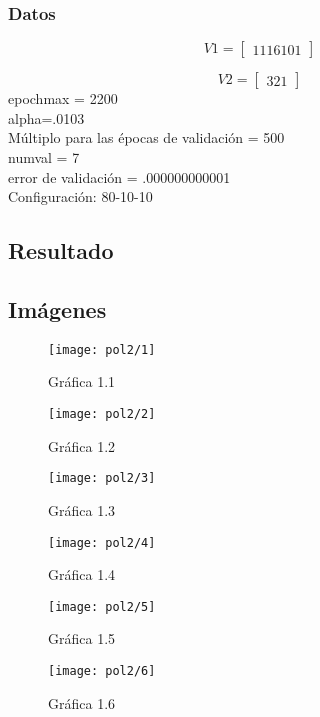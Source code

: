 \documentclass{article}
\begin{document}
\subsubsection{Datos}
\[V1=
\begin{bmatrix}
11 16 10 1
\end{bmatrix}\]

\[V2=
\begin{bmatrix}
3 2 1
\end{bmatrix}\]
epochmax = 2200\\
alpha=.0103\\
Múltiplo para las épocas de validación = 500\\
numval = 7\\
error de validación = .000000000001\\
Configuración: 80-10-10
\subsection{Resultado}
\subsection{Imágenes}
\begin{figure}[htpb]
	\centering
	\texttt{[image: pol2/1]}
	\caption{Gráfica 1.1}
\end{figure}

\begin{figure}[htpb]
	\centering
	\texttt{[image: pol2/2]}
	\caption{Gráfica 1.2}
\end{figure}

\begin{figure}[htpb]
	\centering
	\texttt{[image: pol2/3]}
	\caption{Gráfica 1.3}
\end{figure}

\begin{figure}[htpb]
	\centering
	\texttt{[image: pol2/4]}
	\caption{Gráfica 1.4}
\end{figure}

\begin{figure}[htpb]
	\centering
	\texttt{[image: pol2/5]}
	\caption{Gráfica 1.5}
\end{figure}

\begin{figure}[htpb]
	\centering
	\texttt{[image: pol2/6]}
	\caption{Gráfica 1.6}
\end{figure}
\end{document}
